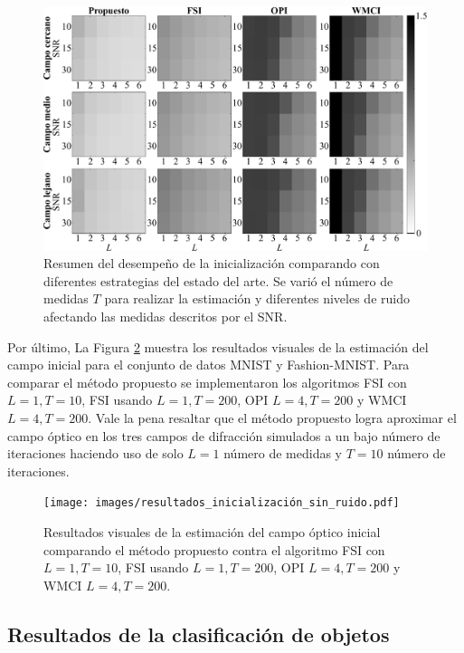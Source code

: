\begin{figure}[h!]
         \includegraphics[width=1\linewidth]{images/Noisy_Initializations.pdf}
        \caption{Resumen del desempeño de la inicialización comparando con diferentes estrategias del estado del arte. Se varió el número de medidas $T$ para realizar la estimación y diferentes niveles de ruido afectando las medidas descritos por el SNR.}
        \label{fig:noisy_scenario}
\end{figure}

Por último, La Figura \ref{fig:resultados_inicialización_sin_ruido} muestra los resultados visuales de la estimación del campo inicial para el conjunto de datos MNIST y Fashion-MNIST. Para comparar el método propuesto se implementaron los algoritmos FSI con $L = 1, T = 10$, FSI usando $L = 1, T=200$, OPI $L = 4, T=200$ y WMCI $L = 4, T=200$. Vale la pena resaltar que el método propuesto logra aproximar el campo óptico en los tres campos de difracción simulados a un bajo número de iteraciones haciendo uso de solo $L=1$ número de medidas y $T=10$ número de iteraciones.

\begin{figure}[!h]
    \centering
    \texttt{[image: images/resultados\_inicialización\_sin\_ruido.pdf]}
    \caption{Resultados visuales de la estimación del campo óptico inicial comparando el método propuesto contra el algoritmo FSI con $L = 1, T = 10$, FSI usando $L = 1, T=200$, OPI $L = 4, T=200$ y WMCI $L = 4, T=200$.}
    \label{fig:resultados_inicialización_sin_ruido}
\end{figure}

\subsection{Resultados de la clasificación de objetos}

